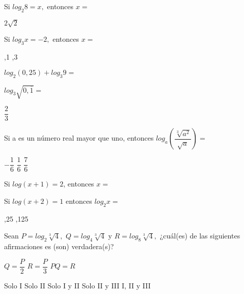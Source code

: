 \documentclass[pagina vacia]{srs}
\begin{document}
\begin{preguntas}
\pregunta Si $log_{2}8=x,$ entonces $x=$
\begin{vertical}
\alternativa $2\sqrt{2}$
\end{vertical}

\pregunta Si $log_{3}x=-2,$ entonces $x=$
\begin{vertical}
,1
,3
\end{vertical}

\pregunta $log_{2}\left(0,25\right)+log_{3}9=$
\begin{vertical}
\end{vertical}

\pregunta $log_{3}\sqrt{0,\overline{1}}=$
\begin{vertical}
\alternativa $\dfrac{2}{3}$
\end{vertical}

\pregunta Si a es un número real mayor que uno, entonces $log_{a}\left(\dfrac{\sqrt[3]{a^{2}}}{\sqrt{a}}\right)=$
\begin{vertical}
\alternativa $-\dfrac{1}{6}$
\alternativa $\dfrac{1}{6}$
\alternativa $\dfrac{7}{6}$
\end{vertical}

\pregunta Si $log\left(x+1\right)=2$, entonces $x=$
\begin{vertical}
\end{vertical}

\pregunta Si $log\left(x+2\right)=1$ entonces $log_{2}x=$
\begin{vertical}
,25
,125
\end{vertical}

\pregunta Sean $P=log_{2}\sqrt[3]{4},$ $Q=log_{4}\sqrt[3]{4}$ y $R=log_{8}\sqrt[3]{4},$ ¿cuál(es) de las siguientes afirmaciones es (son) verdadera(s)?
\begin{verticali}
\alternativa $Q=\dfrac{P}{2}$
\alternativa $R=\dfrac{P}{3}$
\alternativa $PQ=R$
\end{verticali}
\begin{vertical}
\alternativa Solo I
\alternativa Solo II
\alternativa Solo I y II
\alternativa Solo II y III
\alternativa I, II y III
\end{vertical}


\end{preguntas}
\end{document}
